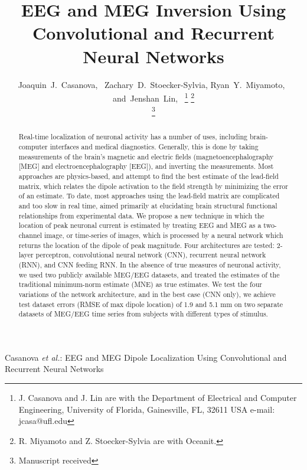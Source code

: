 \documentclass[journal,12pt,onecolumn,draftclsnofoot,]{IEEEtran}
\begin{document}

\title{EEG and MEG Inversion Using Convolutional and Recurrent Neural Networks}


\author{Joaquin~J.~Casanova,~
        Zachary~D.~Stoecker-Sylvia,
        Ryan~Y.~Miyamoto,~
        and~Jenshan~Lin,~%
\thanks{J. Casanova and J. Lin are with the Department
of Electrical and Computer Engineering, University of Florida, Gainesville,
FL, 32611 USA e-mail: jcasa@ufl.edu}%
\thanks{R. Miyamoto and Z. Stoecker-Sylvia are with Oceanit.}%

\thanks{Manuscript received }}

%
{Casanova \MakeLowercase{\textit{et al.}}: EEG and MEG Dipole Localization Using Convolutional and Recurrent Neural Networks}
\maketitle

\begin{abstract}

  Real-time localization of neuronal activity has a number of uses, including brain-computer interfaces and medical diagnostics. Generally, this is done by taking measurements of the brain's magnetic and electric fields (magnetoencephalography [MEG] and electroencephalography [EEG]), and inverting the measurements. Most approaches are physics-based, and attempt to find the best estimate of the lead-field matrix, which relates the dipole activation to the field strength by minimizing the error of an estimate. To date, most approaches using the lead-field matrix are complicated and too slow in real time, aimed primarily at elucidating brain structural functional relationships from experimental data. We propose a new technique in which the location of peak neuronal current is estimated by treating EEG and MEG as a two-channel image, or time-series of images, which is processed by a neural network which returns the location of the dipole of peak magnitude. Four architectures are tested: 2-layer perceptron, convolutional neural network (CNN), recurrent neural network (RNN), and CNN feeding RNN. In the absence of true measures of neuronal activity, we used two publicly available MEG/EEG datasets, and treated the estimates of the traditional minimum-norm estimate (MNE) as true estimates. We test the four variations of the network architecture, and in the best case (CNN only), we achieve test dataset errors (RMSE of max dipole location) of 1.9 and 5.1 mm on two separate datasets of MEG/EEG time series from subjects with different types of stimulus.
  
\end{abstract}
\end{document}
